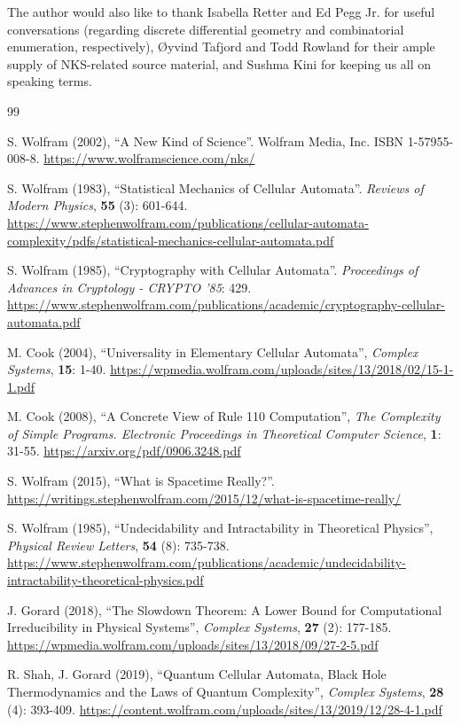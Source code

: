 \documentclass{article}
\begin{document}
The author would also like to thank Isabella Retter and Ed Pegg Jr. for useful conversations (regarding discrete differential geometry and combinatorial enumeration, respectively), {\O}yvind Tafjord and Todd Rowland for their ample supply of NKS-related source material, and Sushma Kini for keeping us all on speaking terms.

\begin{thebibliography}{99}

S. Wolfram (2002), ``A New Kind of Science''. Wolfram Media, Inc. ISBN 1-57955-008-8. \url{https://www.wolframscience.com/nks/}

S. Wolfram (1983), ``Statistical Mechanics of Cellular Automata''. \textit{Reviews of Modern Physics}, \textbf{55} (3): 601-644. \url{https://www.stephenwolfram.com/publications/cellular-automata-complexity/pdfs/statistical-mechanics-cellular-automata.pdf}

S. Wolfram (1985), ``Cryptography with Cellular Automata''. \textit{Proceedings of Advances in Cryptology - CRYPTO '85}: 429. \url{https://www.stephenwolfram.com/publications/academic/cryptography-cellular-automata.pdf}

M. Cook (2004), ``Universality in Elementary Cellular Automata'', \textit{Complex Systems}, \textbf{15}: 1-40. \url{https://wpmedia.wolfram.com/uploads/sites/13/2018/02/15-1-1.pdf}

M. Cook (2008), ``A Concrete View of Rule 110 Computation'', \textit{The Complexity of Simple Programs. Electronic Proceedings in Theoretical Computer Science}, \textbf{1}: 31-55. \url{https://arxiv.org/pdf/0906.3248.pdf}

S. Wolfram (2015), ``What is Spacetime Really?''. \url{https://writings.stephenwolfram.com/2015/12/what-is-spacetime-really/}

S. Wolfram (1985), ``Undecidability and Intractability in Theoretical Physics'', \textit{Physical Review Letters}, \textbf{54} (8): 735-738. \url{https://www.stephenwolfram.com/publications/academic/undecidability-intractability-theoretical-physics.pdf}

J. Gorard (2018), ``The Slowdown Theorem: A Lower Bound for Computational Irreducibility in Physical Systems'', \textit{Complex Systems}, \textbf{27} (2): 177-185. \url{https://wpmedia.wolfram.com/uploads/sites/13/2018/09/27-2-5.pdf}

R. Shah, J. Gorard (2019), ``Quantum Cellular Automata, Black Hole Thermodynamics and the Laws of Quantum Complexity'', \textit{Complex Systems}, \textbf{28} (4): 393-409. \url{https://content.wolfram.com/uploads/sites/13/2019/12/28-4-1.pdf}


\end{thebibliography}
\end{document}
